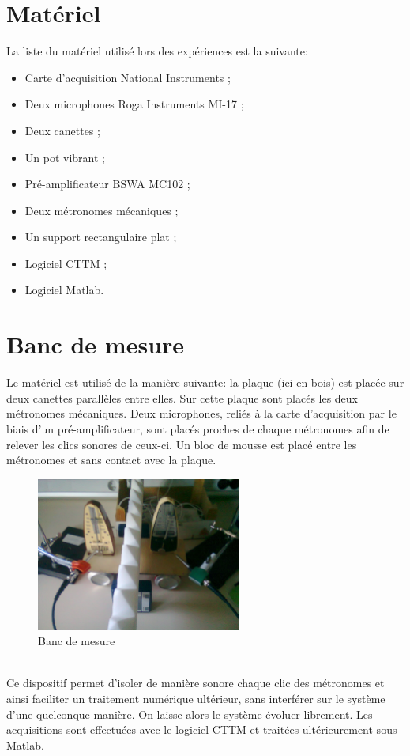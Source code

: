 \documentclass[a4paper,11pt]{report}
\begin{document}
\section{Matériel}
La liste du matériel utilisé lors des expériences est la suivante:\\
\begin{itemize}[label=\textbullet, leftmargin=* ,parsep=0cm,itemsep=0cm,topsep=0cm,font=\tiny]
\item Carte d'acquisition National Instruments ;
\item Deux microphones Roga Instruments MI-17 ;
\item Deux canettes ;
\item Un pot vibrant ;
\item Pré-amplificateur BSWA MC102 ;
\item Deux métronomes mécaniques ;
\item Un support rectangulaire plat ;
\item Logiciel CTTM ;
\item Logiciel Matlab.
\end{itemize}

\section{Banc de mesure}
Le matériel est utilisé de la manière suivante: la plaque (ici en bois) est placée sur deux canettes parallèles entre elles. Sur cette plaque sont placés les deux métronomes mécaniques. Deux microphones, reliés à la carte d'acquisition par le biais d'un pré-amplificateur, sont placés proches de chaque métronomes afin de relever les clics sonores de ceux-ci. Un bloc de mousse est placé entre les métronomes et sans contact avec la plaque.
\begin{figure}[h]
\centering
\includegraphics[width=0.6\textwidth]{BancMesure}
\caption{Banc de mesure}\label{Banc}
\end{figure}\\
Ce dispositif permet d'isoler de manière sonore chaque clic des métronomes et ainsi faciliter un traitement numérique ultérieur, sans interférer sur le système d'une quelconque manière. On laisse alors le système évoluer librement. Les acquisitions sont effectuées avec le logiciel CTTM et traitées ultérieurement sous Matlab.
\end{document}
